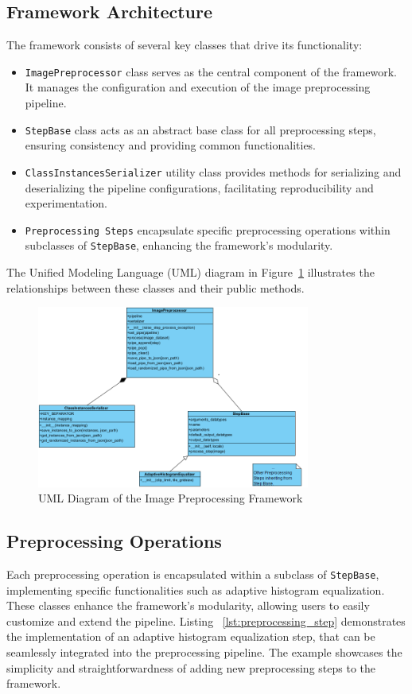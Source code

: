 \documentclass[journal ]{new-aiaa}
\begin{document}
\subsection{Framework Architecture}
\label{sec:framework_architecture}
The framework consists of several key classes that drive its functionality:
\begin{itemize}
    \item \texttt{ImagePreprocessor} class serves as the central component of the framework. It manages the configuration and execution of the image preprocessing pipeline.
    \item \texttt{StepBase} class acts as an abstract base class for all preprocessing steps, ensuring consistency and providing common functionalities.
    \item \texttt{ClassInstancesSerializer} utility class provides methods for serializing and deserializing the pipeline configurations, facilitating reproducibility and experimentation.
    \item \texttt{Preprocessing Steps} encapsulate specific preprocessing operations within subclasses of \texttt{StepBase}, enhancing the framework's modularity.
\end{itemize}

The Unified Modeling Language (UML) diagram in Figure~\ref{fig:framework_uml} illustrates the relationships between these classes and their public methods.

\newpage
\begin{figure}[h]
    \centering
    \includegraphics[width=0.8\textwidth]{image_preprocessing_uml.png}
    \caption{UML Diagram of the Image Preprocessing Framework}
    \label{fig:framework_uml}
\end{figure}


\subsection{Preprocessing Operations}
Each preprocessing operation is encapsulated within a subclass of \texttt{StepBase}, implementing specific functionalities such as adaptive histogram equalization. These classes enhance the framework's modularity, allowing users to easily customize and extend the pipeline. Listing ~\ref{lst:preprocessing_step} demonstrates the implementation of an adaptive histogram equalization step, that can be seamlessly integrated into the preprocessing pipeline. The example showcases the simplicity and straightforwardness of adding new preprocessing steps to the framework.\\
\end{document}
